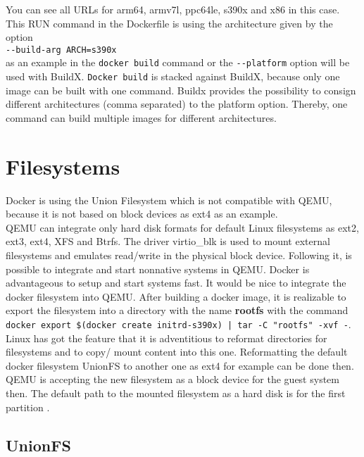 You can see all URLs for arm64, armv7l, ppc64le, s390x and x86 in this case. This RUN command in the Dockerfile is using the architecture given by the option \\
\lstinline!--build-arg ARCH=s390x! \\
as an example in the \lstinline!docker build! command or the \lstinline!--platform! option will be used with BuildX.
\lstinline!Docker build! is stacked against BuildX, because only one image can be built with one command.
Buildx provides the possibility to consign different architectures (comma separated) to the platform option. Thereby, one command can build multiple images for different architectures.

\section{Filesystems}\label{FileSystems}

Docker is using the Union Filesystem which is not compatible with QEMU, because it is not based on block devices as ext4 as an example. \\
QEMU can integrate only hard disk formats for default Linux filesystems as ext2, ext3, ext4, XFS and Btrfs. 
The driver virtio\_blk is used to mount external filesystems and emulates read/write in the physical block device\cite{Barboza2018}. Following it, is possible to integrate and start nonnative systems in QEMU. 
Docker is advantageous to setup and start systems fast. 
It would be nice to integrate the docker filesystem into QEMU. After building a docker image, it is realizable to export the filesystem into a directory with the name \textbf{rootfs} with the command \\ 
\lstinline!docker export $(docker create initrd-s390x) | tar -C "rootfs" -xvf -!. \\

Linux has got the feature that it is adventitious to reformat directories for filesystems and to copy/ mount content into this one. Reformatting the default docker filesystem UnionFS to another one as ext4 for example can be done then. \\
QEMU is accepting the new filesystem as a block device for the guest system then. The default path to the mounted filesystem as a hard disk is  for the first partition \cite[~p.22]{White2020}.

\subsection{UnionFS}\label{UnionFS}

